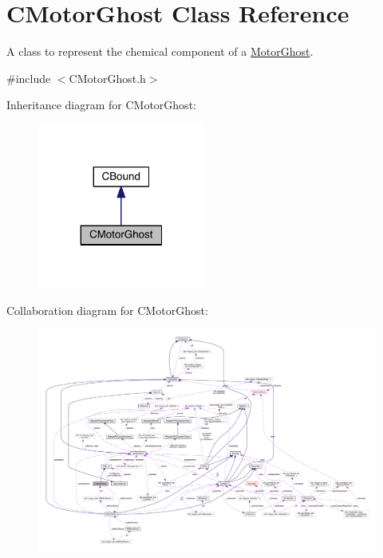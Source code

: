 \hypertarget{classCMotorGhost}{\section{C\+Motor\+Ghost Class Reference}
\label{classCMotorGhost}
}


A class to represent the chemical component of a \hyperlink{classMotorGhost}{Motor\+Ghost}.  




{\ttfamily \#include $<$C\+Motor\+Ghost.\+h$>$}



Inheritance diagram for C\+Motor\+Ghost\+:\nopagebreak
\begin{figure}[H]
\begin{center}
\leavevmode
\includegraphics[width=155pt]{classCMotorGhost__inherit__graph}
\end{center}
\end{figure}


Collaboration diagram for C\+Motor\+Ghost\+:\nopagebreak
\begin{figure}[H]
\begin{center}
\leavevmode
\includegraphics[width=350pt]{classCMotorGhost__coll__graph}
\end{center}
\end{figure}
